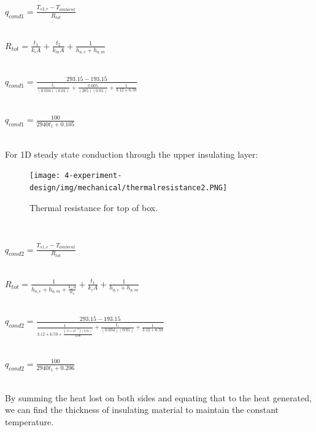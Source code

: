 {\begin{center}
 $q_{cond1} = \frac{T_{s2,e}-T_{ambient}}{R_{tot}} $\\
 
 \ 
 
 $R_{tot} = \frac{t_{1}}{k_{i}A} + \frac{t_{2}}{k_{m}A} + \frac{1}{h_{a,e}+h_{a,m}} $\\
 
 \
 \ 
 
 $q_{cond1} = \frac{293.15 - 193.15}{\frac{t_{1}}{(0.034)(0.01)} + \frac{0.005}{(205)(0.01)} + \frac{1}{3.12+6.59}} $\\
 
 \  
 \ 
 
 $q_{cond1} = \frac{100}{2940t_{1}+0.105} $\\
 
\end{center} \\
 
 
For 1D steady state conduction through the upper insulating layer: \\

	\begin{figure}[h!]
    \centering
    \texttt{[image: 4-experiment-design/img/mechanical/thermalresistance2.PNG]}
	\caption{Thermal resistance for top of box.}
	\label{fig:thermalresistance2}
	\end{figure} \\

\begin{center}
 $q_{cond2} = \frac{T_{s1,e}-T_{ambient}}{R_{tot}} $\\
 
 \ 
 
 $R_{tot} = \frac{1}{h_{a,e}+h_{a,m}+\frac{k_{a}A}{w_{a}}} + \frac{t_{1}}{k_{i}A} + \frac{1}{h_{a,e}+h_{a,m}}  $\\
 
 \
 \ 
 
 $q_{cond2} = \frac{293.15 - 193.15}{\frac{1}{3.12+6.59+\frac{(15\times10^{-3})(0.01)}{0.08}} + \frac{t_{1}}{(0.034)(0.01)} + \frac{1}{3.12+6.59}} $\\
 
 \  
 \ 
 
 $q_{cond2} = \frac{100}{2940t_{1}+0.206} $\\
 
\end{center} \\

By summing the heat lost on both sides and equating that to the heat generated, we can find the thickness of insulating material to maintain the constant temperature. \\

}
